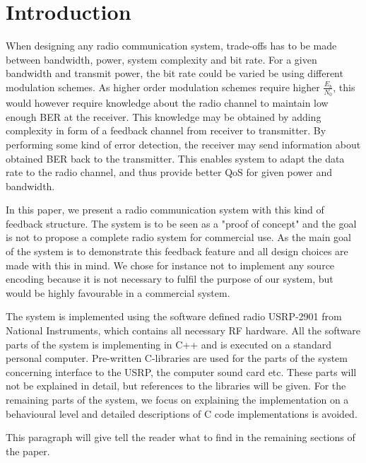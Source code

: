 \section{Introduction}
\label{sec:Introduction}
When designing any radio communication system, trade-offs has to be made between bandwidth, power, system complexity and bit rate. For a given bandwidth and transmit power, the bit rate could be varied be using different modulation schemes. As higher order modulation schemes require higher $\frac{E_b}{N_0}$, this would however require knowledge about the radio channel to maintain low enough BER at the receiver. This knowledge may be obtained by adding complexity in form of a feedback channel from receiver to transmitter. By performing some kind of error detection, the receiver may send information about obtained BER back to the transmitter. This enables system to adapt the data rate to the radio channel, and thus provide better QoS for given power and bandwidth. 

In this paper, we present a radio communication system with this kind of feedback structure. The system is to be seen as a "proof of concept" and the goal is not to propose a complete radio system for commercial use. As the main goal of the system is to demonstrate this feedback feature and all design choices are made with this in mind. We chose for instance not to implement any source encoding because it is not necessary to fulfil the purpose of our system, but would be highly favourable in a commercial system. 

The system is implemented using the software defined radio USRP-2901\cite{USRP2901} from National Instruments, which contains all necessary RF hardware. All the software parts of the system is implementing in C++ and is executed on a standard personal computer. Pre-written C-libraries are used for the parts of the system concerning interface to the USRP, the computer sound card etc. These parts will not be explained in detail, but references to the libraries will be given. For the remaining parts of the system, we focus on explaining the implementation on a behavioural level and detailed descriptions of C code implementations is avoided. 

This paragraph will give tell the reader what to find in the remaining sections of the paper. 
